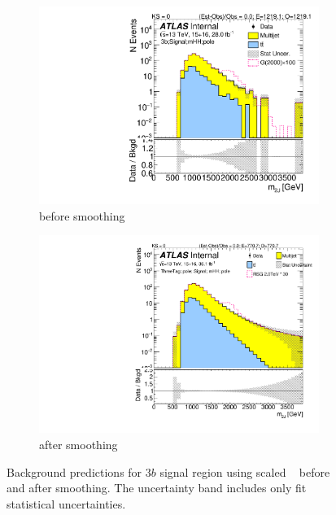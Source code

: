 \begin{figure}[htb!]
  \centering
  \captionsetup{justification=centering}
    \begin{subfigure}[b]{0.41\textwidth}
        \includegraphics[width=\textwidth,angle=-90]{figures/boosted/Signal/b77_ThreeTag_Signal_mHH_pole_1_blind.pdf}
        \caption{before smoothing}
        \label{fig:signal-region-mjjscaled-smoothing-3b-qcd}
    \end{subfigure}
    \quad \quad \quad 
    \begin{subfigure}[b]{0.41\textwidth}
        \includegraphics[width=\textwidth,angle=-90]{figures/boosted/Smooth/Moriond_bkg_9_ThreeTag_pole_Signal_mHH_pole_1_blind.pdf}
        \caption{after smoothing}
        \label{fig:signal-region-mjjscaled-smoothing-3b-ttbar}
    \end{subfigure}
    \caption{Background predictions for $3b$ signal region using scaled \mtwoJ~ before and after smoothing. The uncertainty band includes only fit statistical uncertainties.}
  \label{fig:signal-region-mjjscaled-smooth-bkg-nosys-3b}
\end{figure}

